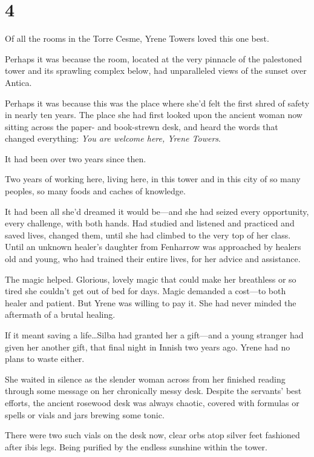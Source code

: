 
\chapter{4}

Of all the rooms in the Torre Cesme, Yrene Towers loved this one best.

Perhaps it was because the room, located at the very pinnacle of the palestoned tower and its sprawling complex below, had unparalleled views of the sunset over Antica.

Perhaps it was because this was the place where she'd felt the first shred of safety in nearly ten years.
The place she had first looked upon the ancient woman now sitting across the paper- and book-strewn desk, and heard the words that changed everything: \emph{You are welcome here, Yrene Towers}.

It had been over two years since then.

Two years of working here, living here, in this tower and in this city of so many peoples, so many foods and caches of knowledge.

It had been all she'd dreamed it would be---and she had seized every opportunity, every challenge, with both hands.
Had studied and listened and practiced and saved lives, changed them, until she had climbed to the very top of her class.
Until an unknown healer's daughter from Fenharrow was approached by healers old and young, who had trained their entire lives, for her advice and assistance.

The magic helped.
Glorious, lovely magic that could make her breathless or so tired she couldn't get out of bed for days.
Magic demanded a cost---to both healer and patient.
But Yrene was willing to pay it.
She had never minded the aftermath of a brutal healing.

If it meant saving a life\ldots Silba had granted her a gift---and a young stranger had given her another gift, that final night in Innish two years ago.
Yrene had no plans to waste either.

She waited in silence as the slender woman across from her finished reading through some message on her chronically messy desk.
Despite the servants' best efforts, the ancient rosewood desk was always chaotic, covered with formulas or spells or vials and jars brewing some tonic.

There were two such vials on the desk now, clear orbs atop silver feet fashioned after ibis legs.
Being purified by the endless sunshine within the tower.

